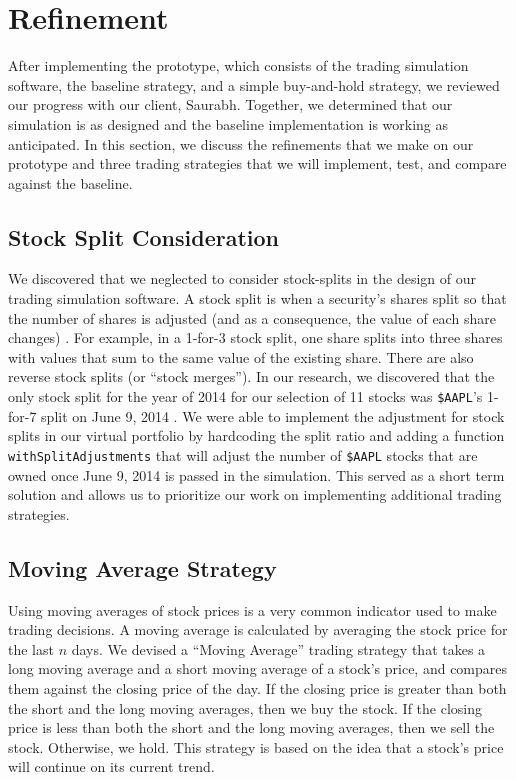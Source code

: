 
\section{Refinement}

After implementing the prototype, which consists of the trading simulation software, the baseline strategy, and a simple buy-and-hold strategy, we reviewed our progress with our client, Saurabh.
Together, we determined that our simulation is as designed and the baseline implementation is working as anticipated.
In this section, we discuss the refinements that we make on our prototype and three trading strategies that we will implement, test, and compare against the baseline.

\subsection{Stock Split Consideration}

We discovered that we neglected to consider stock-splits in the design of our trading simulation software.
A stock split is when a security's shares split so that the number of shares is adjusted (and as a consequence, the value of each share changes) \cite{stocksplit}.
For example, in a 1-for-3 stock split, one share splits into three shares with values that sum to the same value of the existing share.
There are also reverse stock splits (or ``stock merges'').
In our research, we discovered that the only stock split for the year of 2014 for our selection of 11 stocks was \texttt{\$AAPL}'s 1-for-7 split on June 9, 2014 \cite{appleSplit}.
We were able to implement the adjustment for stock splits in our virtual portfolio by hardcoding the split ratio and adding a function \texttt{withSplitAdjustments} that will adjust the number of \texttt{\$AAPL} stocks that are owned once June 9, 2014 is passed in the simulation.
This served as a short term solution and allows us to prioritize our work on implementing additional trading strategies.

\subsection{Moving Average Strategy}

Using moving averages of stock prices is a very common indicator used to make trading decisions.
A moving average is calculated by averaging the stock price for the last $n$ days.
We devised a ``Moving Average'' trading strategy that takes a long moving average and a short moving average of a stock's price, and compares them against the closing price of the day.
If the closing price is greater than both the short and the long moving averages, then we buy the stock.
If the closing price is less than both the short and the long moving averages, then we sell the stock.
Otherwise, we hold.
This strategy is based on the idea that a stock's price will continue on its current trend.

